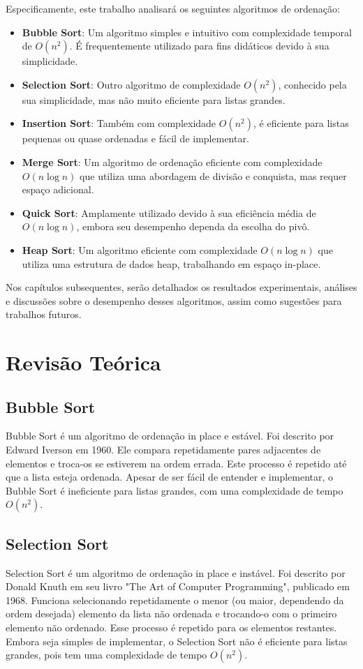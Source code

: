 \documentclass[tcc2]{uftex}
\begin{document}
Especificamente, este trabalho analisará os seguintes algoritmos de ordenação:
\begin{itemize}
    \item \textbf{Bubble Sort}: Um algoritmo simples e intuitivo com complexidade temporal de $O(n^2)$. É frequentemente utilizado para fins didáticos devido à sua simplicidade.
    \item \textbf{Selection Sort}: Outro algoritmo de complexidade $O(n^2)$, conhecido pela sua simplicidade, mas não muito eficiente para listas grandes.
    \item \textbf{Insertion Sort}: Também com complexidade $O(n^2)$, é eficiente para listas pequenas ou quase ordenadas e fácil de implementar.
    \item \textbf{Merge Sort}: Um algoritmo de ordenação eficiente com complexidade $O(n \log n)$ que utiliza uma abordagem de divisão e conquista, mas requer espaço adicional.
    \item \textbf{Quick Sort}: Amplamente utilizado devido à sua eficiência média de $O(n \log n)$, embora seu desempenho dependa da escolha do pivô.
    \item \textbf{Heap Sort}: Um algoritmo eficiente com complexidade $O(n \log n)$ que utiliza uma estrutura de dados heap, trabalhando em espaço in-place.
\end{itemize}

Nos capítulos subsequentes, serão detalhados os resultados experimentais, análises e discussões sobre o desempenho desses algoritmos, assim como sugestões para trabalhos futuros.

\chapter{Revisão Teórica}

\section{Bubble Sort}
Bubble Sort é um algoritmo de ordenação in place e estável. Foi descrito por Edward Iverson em 1960. Ele compara repetidamente pares adjacentes de elementos e troca-os se estiverem na ordem errada. Este processo é repetido até que a lista esteja ordenada. Apesar de ser fácil de entender e implementar, o Bubble Sort é ineficiente para listas grandes, com uma complexidade de tempo $O(n^2)$.

\section{Selection Sort}
Selection Sort é um algoritmo de ordenação in place e instável. Foi descrito por Donald Knuth em seu livro "The Art of Computer Programming", publicado em 1968. Funciona selecionando repetidamente o menor (ou maior, dependendo da ordem desejada) elemento da lista não ordenada e trocando-o com o primeiro elemento não ordenado. Esse processo é repetido para os elementos restantes. Embora seja simples de implementar, o Selection Sort não é eficiente para listas grandes, pois tem uma complexidade de tempo $O(n^2)$.
\end{document}
